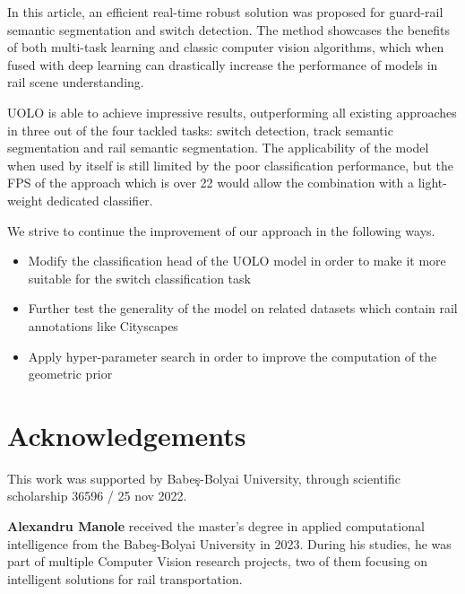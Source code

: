 \documentclass[conference]{IEEEtran}
\begin{document}
In this article, an efficient real-time robust solution was proposed for guard-rail semantic segmentation and switch detection. The method showcases the benefits of both multi-task learning and classic computer vision algorithms, which when fused with deep learning can drastically increase the performance of models in rail scene understanding. 

UOLO is able to achieve impressive results, outperforming all existing approaches in three out of the four tackled tasks: switch detection, track semantic segmentation and rail semantic segmentation. The applicability of the model when used by itself is still limited by the poor classification performance, but the FPS of the approach which is over 22 would allow the combination with a light-weight dedicated classifier.

We strive to continue the improvement of our approach in the following ways.
\begin{itemize}
    \item Modify the classification head of the UOLO model in order to make it more suitable for the switch classification task
    \item Further test the generality of the model on related datasets which contain rail annotations like Cityscapes 
    \item Apply hyper-parameter search in order to improve the computation of the geometric prior
\end{itemize}

\section{Acknowledgements}
\label{acknowledgements}

This work was supported by Babe\c{s}-Bolyai University, through scientific scholarship 36596 / 25 nov 2022. 

\balance

\printbibliography

\vspace*{1\baselineskip}

\textbf{Alexandru Manole} received the master’s degree in applied computational intelligence from the Babe\c{s}-Bolyai University in 2023. During his studies, he was part of multiple Computer Vision research projects, two of them focusing on intelligent solutions for rail transportation.

\vspace*{1\baselineskip}
\end{document}
